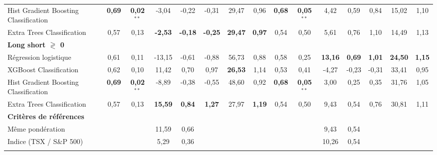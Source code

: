 \begin{table}[h]
{\begin{tabular}{l *{7}{S[table-format=3.2]} | *{7}{S[table-format=3.2]}}
Hist Gradient Boosting Classification & \bfseries\color{Green}0,69 & \bfseries\color{Green}0,02$^{**}$ & -3,04 & -0,22 & -0,31 & 29,47 & 0,96 & \bfseries\color{Green}0,68 & \bfseries\color{Green}0,05$^{**}$ & 4,42 & 0,59 & 0,84 & 15,02 & 1,10 \\ \addlinespace[0.1cm]
Extra Trees Classification & 0,57 & 0,13 & \bfseries\color{Green}-2,53 & \bfseries\color{Green}-0,18 & \bfseries\color{Green}-0,25 & \bfseries\color{Green}29,47 & \bfseries\color{Green}0,97 & 0,54 & 0,50 & 5,61 & 0,76 & 1,10 & 14,49 & 1,13 \\ \addlinespace[0.1cm]
\textbf{Long short $\gtrless$ 0} &  &  &  &  &  &  &  &  &  &  &  &  &  & \\
\addlinespace[0.1cm]
Régression logistique & 0,61 & 0,11 & -13,15 & -0,61 & -0,88 & 56,73 & 0,88 & 0,58 & 0,25 & \bfseries\color{Green}13,16 & \bfseries\color{Green}0,69 & \bfseries\color{Green}1,01 & \bfseries\color{Green}24,50 & \bfseries\color{Green}1,15 \\ \addlinespace[0.1cm]
XGBoost Classification & 0,62 & 0,10 & 11,42 & 0,70 & 0,97 & \bfseries\color{Green}26,53 & 1,14 & 0,53 & 0,41 & -4,27 & -0,23 & -0,31 & 33,41 & 0,95 \\ \addlinespace[0.1cm]
Hist Gradient Boosting Classification & \bfseries\color{Green}0,69 & \bfseries\color{Green}0,02$^{**}$ & -8,89 & -0,38 & -0,55 & 48,60 & 0,92 & \bfseries\color{Green}0,68 & \bfseries\color{Green}0,05$^{**}$ & 3,00 & 0,25 & 0,35 & 31,76 & 1,05 \\ \addlinespace[0.1cm]
Extra Trees Classification & 0,57 & 0,13 & \bfseries\color{Green}15,59 & \bfseries\color{Green}0,84 & \bfseries\color{Green}1,27 & 27,97 & \bfseries\color{Green}1,19 & 0,54 & 0,50 & 9,43 & 0,54 & 0,76 & 30,81 & 1,11 \\ \addlinespace[0.1cm]
\textbf{Critères de références} &  &  &  &  &  &  &  &  &  &  &  &  &  & \\
\addlinespace[0.1cm]
Même pondération &  &  & 11,59 & 0,66 &  &  &  &  &  & 9,43 & 0,54 &  &  &  \\ \addlinespace[0.1cm]
Indice (TSX / S\&P 500) &  &  & 5,29 & 0,36 &  &  &  &  &  & 10,26 & 0,54 &  &  &  \\ \addlinespace[0.1cm]
\bottomrule
\end{tabular}}
\end{table}
